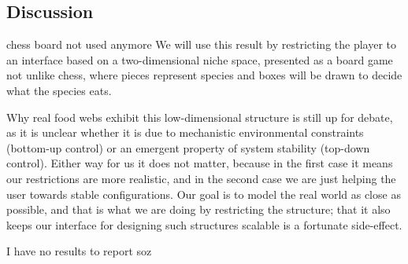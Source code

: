 \subsection{Discussion}
     chess board not used anymore
        We will use this result by restricting the player to an interface based on a two-dimensional niche space, presented as a board game not unlike chess, where pieces represent species and boxes will be drawn to decide what the species eats.

        Why real food webs exhibit this low-dimensional structure is still up for debate, as it is unclear whether it is due to mechanistic environmental constraints (bottom-up control) or an emergent property of system stability (top-down control).
        Either way for us it does not matter, because in the first case it means our restrictions are more realistic, and in the second case we are just helping the user towards stable configurations.
        Our goal is to model the real world as close as possible, and that is what we are doing by restricting the structure; that it also keeps our interface for designing such structures scalable is a fortunate side-effect.

I have no results to report soz